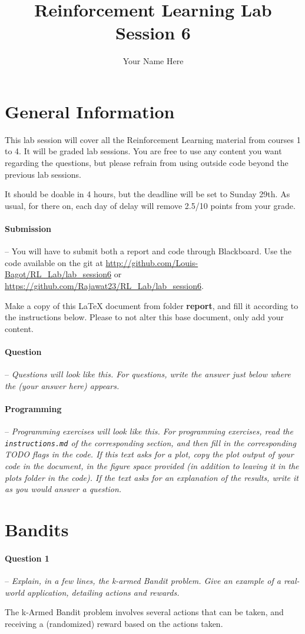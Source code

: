 \documentclass[a4paper]{article}
\title{Reinforcement Learning Lab Session 6}
\author{Your Name Here}
\newcommand{\question}[2]{
\paragraph{Question #1} -- \textit{#2}

}
\newcommand{\programming}[1]{
\paragraph{Programming} -- \textit{#1}

}
\begin{document}
	\maketitle
	\section*{General Information}
		This lab session will cover all the Reinforcement Learning material from courses 1 to 4. 
		It will be graded lab sessions. 
		You are free to use any content you want regarding the questions, but please refrain from using outside code beyond the previous lab sessions.

		It should be doable in 4 hours, but the deadline will be set to Sunday 29th. 
		As usual, for there on, each day of delay will remove 2.5/10 points from your grade.

		\paragraph{Submission} --
			You will have to submit both a report and code through Blackboard. 
			Use the code available on the git at \url{http://github.com/Louis-Bagot/RL_Lab/lab_session6} or \url{https://github.com/Rajawat23/RL_Lab/lab_session6}.

			Make a copy of this LaTeX document from folder \textbf{report}, and fill it according to the instructions below. 
			Please to not alter this base document, only add your content.

		\question{}{Questions will look like this. For questions, write the answer just below where the (your answer here) appears.}

		\programming{Programming exercises will look like this. 
				For programming exercises, read the \texttt{instructions.md} of the corresponding section, and then fill in the corresponding TODO flags in the code. 
				If this text asks for a plot, copy the plot output of your code in the document, in the figure space provided (in addition to leaving it in the plots folder in the code). 
				If the text asks for an explanation of the results, write it as you would answer a question.}

	\tableofcontents
	\newpage

	\section{Bandits}
		\question{1}{Explain, in a few lines, the k-armed Bandit problem. 
				Give an example of a real-world application, detailing actions and rewards.}
			The k-Armed Bandit problem involves several actions that can be taken, and receiving a (randomized) reward based on the actions taken.
\end{document}
